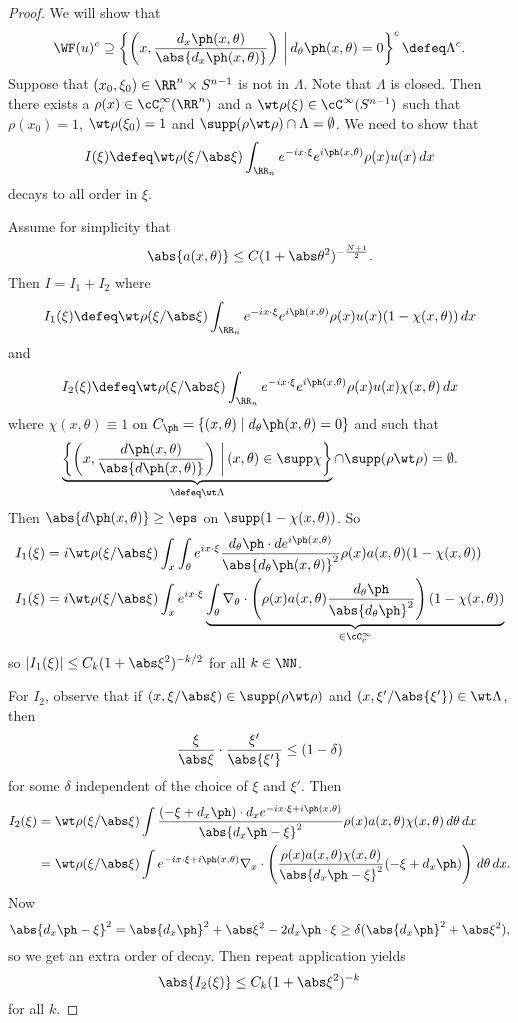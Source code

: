 \begin{proof}
  We will show that
  \[ \WF(u)^c \supseteq \left\{ \left( x,\frac{d_x\ph(x,\theta)}{\abs{d_x\ph(x,\theta)}} \right) \, \bigg\vert \, d_\theta\ph(x,\theta)=0 \right\}^c \defeq \Lambda^c. \]
  Suppose that $(x_0,\xi_0)\in\RR^n\times S^{n-1}$ is not in $\Lambda$.
  Note that $\Lambda$ is closed.
  Then there exists a $\rho(x)\in\cC_c^\infty(\RR^n)$ and a $\wt\rho(\xi)\in\cC^\infty(S^{n-1})$ such that $\rho(x_0)=1$, $\wt\rho(\xi_0)=1$ and $\supp(\rho\wt\rho)\cap\Lambda=\emptyset$.
  We need to show that
  \[ I(\xi) \defeq \wt\rho(\xi/\abs\xi) \int_{\RR_n} e^{-ix\cdot\xi}e^{i\ph(x,\theta)}\rho(x)u(x)\,dx \]
  decays to all order in $\xi$.

  Assume for simplicity that
  \[ \abs{a(x,\theta)} \leq C(1+\abs\theta^2)^{-\frac{N+1}2}. \]
  Then $I=I_1+I_2$ where
  \[ I_1(\xi) \defeq \wt\rho(\xi/\abs\xi) \int_{\RR_n} e^{-ix\cdot\xi}e^{i\ph(x,\theta)}\rho(x)u(x)(1-\chi(x,\theta))\,dx \]
  and
  \[ I_2(\xi) \defeq \wt\rho(\xi/\abs\xi) \int_{\RR_n} e^{-ix\cdot\xi}e^{i\ph(x,\theta)}\rho(x)u(x)\chi(x,\theta)\,dx \]
  where $\chi(x,\theta)\equiv1$ on $C_\ph=\{(x,\theta)\mid d_\theta\ph(x,\theta)=0\}$ and such that
  \[ \underbrace{\left\{ \left( x,\frac{d\ph(x,\theta)}{\abs{d\ph(x,\theta)}} \right) \, \bigg\vert  \, (x,\theta)\in\supp\chi \right\}}_{\defeq\wt\Lambda} \cap \supp(\rho\wt\rho)=\emptyset. \]
  Then $\abs{d\ph(x,\theta)}\geq\eps$ on $\supp(1-\chi(x,\theta))$.
  So
  \begin{align*}
    I_1(\xi) &= i\wt\rho(\xi/\abs\xi)\int_x\int_\theta e^{ix\cdot\xi} \frac{d_\theta\ph\cdot de^{i\ph(x,\theta)}}{\abs{d_\theta\ph(x,\theta)}^2} \rho(x)a(x,\theta)(1-\chi(x,\theta)) \\
    I_1(\xi) &= i\wt\rho(\xi/\abs\xi)\int_x e^{ix\cdot\xi} \underbrace{ \int_\theta \nabla_\theta\cdot \left( \rho(x)a(x,\theta) \frac{d_\theta\ph}{\abs{d_\theta\ph}^2} \right)(1-\chi(x,\theta)) }_{\in \cC_c^\infty}
  \end{align*}
  so $|I_1(\xi)|\leq C_k(1+\abs\xi^2)^{-k/2}$ for all $k\in\NN$.

  For $I_2$, observe that if $(x,\xi/\abs\xi)\in\supp(\rho\wt\rho)$ and $(x,\xi'/\abs{\xi'})\in\wt\Lambda$, then
  \[ \frac{\xi}{\abs\xi} \cdot \frac{\xi'}{\abs{\xi'}} \leq (1-\delta) \]
  for some $\delta$ independent of the choice of $\xi$ and $\xi'$.
  Then
  \begin{align*}
    I_2(\xi) &= \wt\rho(\xi/\abs\xi) \int \frac{(-\xi+d_x\ph) \cdot d_x e^{-ix\cdot\xi+i\ph(x,\theta)}}{\abs{d_x\ph-\xi}^2} \rho(x) a(x,\theta) \chi(x,\theta) \, d\theta \, dx \\
    &= \wt\rho(\xi/\abs\xi) \int e^{-ix\cdot\xi+i\ph(x,\theta)} \nabla_x\cdot \left( \frac{\rho(x) a(x,\theta) \chi(x,\theta)}{\abs{d_x\ph-\xi}^2}{(-\xi+d_x\ph)} \right) \, d\theta \, dx.
  \end{align*}
  Now
  \[ \abs{d_x\ph-\xi}^2 = \abs{d_x\ph}^2+\abs\xi^2-2d_x\ph\cdot\xi \geq \delta(\abs{d_x\ph}^2+\abs\xi^2), \]
  so we get an extra order of decay.
  Then repeat application yields
  \[ \abs{I_2(\xi)} \leq C_k(1+\abs\xi^2)^{-k} \]
  for all $k$.
\end{proof}
